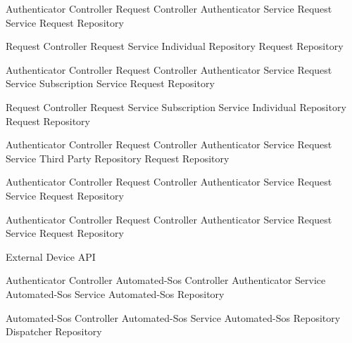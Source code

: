 \documentclass[a4paper]{article}
\begin{document}
\begin{description}
     {Authenticator Controller}
     {Request Controller}
     {Authenticator Service}
     {Request Service}
     {Request Repository}
     
     {Request Controller}
     {Request Service}
     {Individual Repository}
     {Request Repository}
     
     {Authenticator Controller}
     {Request Controller}
     {Authenticator Service}
     {Request Service}
     {Subscription Service}
     {Request Repository}

     {Request Controller}
     {Request Service}
     {Subscription Service}
     {Individual Repository}
     {Request Repository}
     
     {Authenticator Controller}
     {Request Controller}
     {Authenticator Service}
     {Request Service}
     {Third Party Repository}
     {Request Repository}
     
     {Authenticator Controller}
     {Request Controller}
     {Authenticator Service}
     {Request Service}
     {Request Repository}
     
     {Authenticator Controller}
     {Request Controller}
     {Authenticator Service}
     {Request Service}
     {Request Repository}
     
     {External Device API}
     
     {Authenticator Controller}
     {Automated-Sos Controller}
     {Authenticator Service}
     {Automated-Sos Service}
     {Automated-Sos Repository}
     
     {Automated-Sos Controller}
     {Automated-Sos Service}
     {Automated-Sos Repository}
     {Dispatcher Repository}
     

\end{description}
\end{document}
